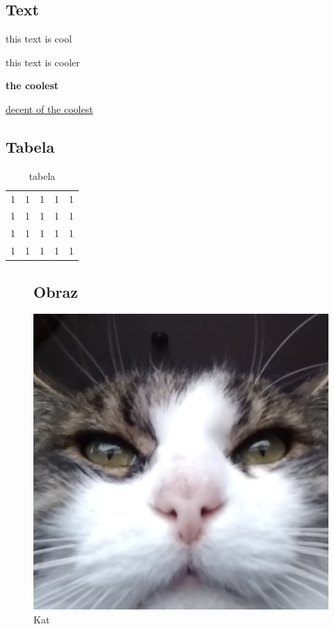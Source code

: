 \begin{center}
\subsection{Text}
this text is cool


this text is cooler

\textbf{the coolest}

\underline{decent of the coolest}


\begin{table}
\subsection{Tabela}
\begin{tabular}{|l|l|l|l|l|}
1 & 1 & 1 & 1 & 1 \\
1 & 1 & 1 & 1 & 1 \\
1 & 1 & 1 & 1 & 1 \\
1 & 1 & 1 & 1 & 1 
\end{tabular}
\caption{tabela}
\end{table}


\begin{figure}
    \subsection{Obraz}
    \centering
    \includegraphics[width=0.5\linewidth]{pictures/kat.png}
    \caption{Kat}
    \label{The cat}
\end{figure}


\end{center}